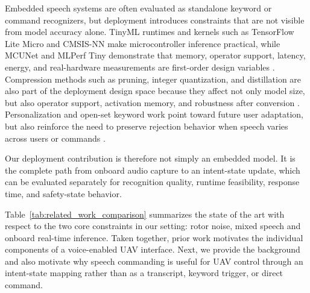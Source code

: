 Embedded speech systems are often evaluated as standalone keyword or command recognizers, but deployment introduces constraints that are not visible from model accuracy alone. TinyML runtimes and kernels such as TensorFlow Lite Micro and CMSIS-NN make microcontroller inference practical, while MCUNet and MLPerf Tiny demonstrate that memory, operator support, latency, energy, and real-hardware measurements are first-order design variables \cite{david2021tflm,lai2018cmsisnn,lin2020mcunet,banbury2021mlperftiny}. Compression methods such as pruning, integer quantization, and distillation are also part of the deployment design space because they affect not only model size, but also operator support, activation memory, and robustness after conversion \cite{han2016deepcompression,hinton2015distilling,jacob2018integerquant}. Personalization and open-set keyword work point toward future user adaptation, but also reinforce the need to preserve rejection behavior when speech varies across users or commands \cite{leroy2019fedkws,rusci2023fewshotopenset}.

Our deployment contribution is therefore not simply an embedded model. It is the complete path from onboard audio capture to an intent-state update, which can be evaluated separately for recognition quality, runtime feasibility, response time, and safety-state behavior.

Table~\ref{tab:related_work_comparison} summarizes the state of the art with respect to the two core constraints in our setting: rotor noise, mixed speech and onboard real-time inference. Taken together, prior work motivates the individual components of a voice-enabled UAV interface. Next, we provide the background and also motivate why speech commanding is useful for UAV control through an intent-state mapping rather than as a transcript, keyword trigger, or direct command.
